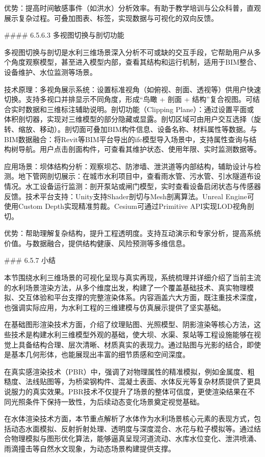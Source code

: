优势：提高时间敏感事件（如洪水）分析效率。有助于教学培训与公众科普，直观展示复杂过程。可叠加图表、标签，实现数据与可视化的双向反馈。

\#\#\#\# 6.5.6.3 多视图切换与剖切功能

多视图切换与剖切是水利三维场景深入分析不可或缺的交互手段，它帮助用户从多个角度观察模型，甚至进入模型内部，查看其结构和运行机制，适用于BIM整合、设备维护、水位监测等场景。

技术原理：多视角展示系统：设置标准视角（如俯视、剖面、透视等）供用户快速切换。支持多视口并排显示不同角度，形成``鸟瞰 + 剖面 + 结构''复合视图。可结合实时数据和三维标注辅助说明。剖切功能（Clipping Plane）：通过设置平面或体积剖切器，实现对三维模型的部分隐藏或显露。剖切区域可由用户交互选择（旋转、缩放、移动）。剖切面可叠加BIM构件信息、设备名称、材料属性等数据。与BIM数据融合：将Revit等BIM平台导出的ifc模型导入场景中，支持属性查询与结构树导航。用户点击剖面构件，可查看其维护状态、使用年限、实时监测数据等。

应用场景：坝体结构分析：观察坝芯、防渗墙、泄洪道等内部结构，辅助设计与检测。地下管网剖切展示：在城市水利项目中，查看雨水管、污水管、引水隧道布设情况。水工设备运行监测：剖开泵站或闸门模型，实时查看设备启闭状态与传感器反馈。技术平台支持：Unity支持Shader剖切与Mesh剖离算法。Unreal Engine可使用Custom Depth实现精准剪裁。Cesium可通过Primitive API实现LOD视角剖切。

优势：帮助理解复杂结构，提升工程透明度。支持互动演示和专家分析，提高系统价值。与数据融合，提供结构健康、风险预测等多维信息。

\#\#\# 6.5.7 小结

本节围绕水利三维场景的可视化呈现与真实再现，系统梳理并详细介绍了当前主流的水利场景渲染方法，从多个维度出发，构建了一个覆盖基础技术、真实物理模拟、交互体验和平台支撑的完整渲染体系。内容涵盖六大方面，既注重技术深度，也强调实际应用，为水利工程的三维建模与仿真展示提供了坚实基础。

在基础图形渲染技术方面，介绍了纹理贴图、光照模型、阴影渲染等核心方法，这些技术是构建水利三维模型外观的基础，使大坝、水渠、泵站等工程设施能够在视觉上具备结构合理、层次清晰、材质真实的表现力。通过贴图与光影的结合，即使是基本几何形体，也能展现出丰富的细节质感和空间深度。

在真实感渲染技术（PBR）中，强调了对物理属性的精准模拟，例如金属度、粗糙度、法线贴图等，为桥梁钢构件、混凝土表面、水体反光等复杂材质提供了更具说服力的真实效果。PBR技术不仅提升了场景的整体可信度，更使渲染结果在不同光照条件下保持一致性，为后续动态变化场景奠定视觉基础。

在水体渲染技术方面，本节重点解析了水体作为水利场景核心元素的表现方式，包括动态水面模拟、反射折射处理、透明度与深度混合、水花与粒子模拟等。通过结合物理模拟与图形优化算法，能够逼真呈现河道流动、水库水位变化、泄洪喷涌、雨滴撞击等自然水文现象，为动态场景构建提供支撑。

